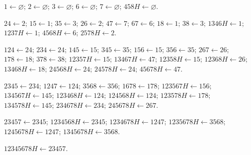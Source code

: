 \documentclass[11pt]{article}
\theoremstyle{definition}
\theoremstyle{remark}
\begin{document}
\begin{description}[leftmargin=1.8em,style=nextline]
\item[$\mathcal A_1\leftarrow\mathcal A_0$]
$1\leftarrow\varnothing$;
$2\leftarrow\varnothing$;
$3\leftarrow\varnothing$;
$6\leftarrow\varnothing$;
$7\leftarrow\varnothing$;
$458H\leftarrow\varnothing$.

\item[$\mathcal A_2\leftarrow\mathcal A_1$]
$24\leftarrow2$; $15\leftarrow1$; $35\leftarrow3$;
$26\leftarrow2$; $47\leftarrow7$; $67\leftarrow6$;
$18\leftarrow1$; $38\leftarrow3$; $1346H\leftarrow1$;
$1237H\leftarrow1$; $4568H\leftarrow6$; $2578H\leftarrow2$.

\item[$\mathcal A_3\leftarrow\mathcal A_2$]
$124\leftarrow24$; $234\leftarrow24$; $145\leftarrow15$;
$345\leftarrow35$; $156\leftarrow15$; $356\leftarrow35$;
$267\leftarrow26$; $178\leftarrow18$; $378\leftarrow38$;
$12357H\leftarrow15$; $13467H\leftarrow47$;
$12358H\leftarrow15$; $12368H\leftarrow26$;
$13468H\leftarrow18$; $24568H\leftarrow24$;
$24578H\leftarrow24$; $45678H\leftarrow47$.

\item[$\mathcal A_4\leftarrow\mathcal A_3$]
$2345\leftarrow234$; $1247\leftarrow124$;
$3568\leftarrow356$; $1678\leftarrow178$;
$123567H\leftarrow156$; $134567H\leftarrow145$;
$123468H\leftarrow124$; $124568H\leftarrow124$;
$123578H\leftarrow178$; $134578H\leftarrow145$;
$234678H\leftarrow234$; $245678H\leftarrow267$.

\item[$\mathcal A_5\leftarrow\mathcal A_4$]
$23457\leftarrow2345$; $1234568H\leftarrow2345$;
$1234678H\leftarrow1247$; $1235678H\leftarrow3568$;
$1245678H\leftarrow1247$; $1345678H\leftarrow3568$.

\item[$\mathcal A_6\leftarrow\mathcal A_5$]
$12345678H\leftarrow23457$.
\end{description}

{}
{\small


}
\end{document}
